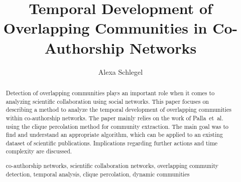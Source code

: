 \documentclass[runningheads,a4paper]{llncs}
\newcommand{\keywords}[1]{\par\addvspace\baselineskip
\noindent\keywordname\enspace\ignorespaces#1}
\begin{document}
\mainmatter  %

\title{Temporal Development of Overlapping Communities in Co-Authorship Networks}


%
%
\author{Alexa Schlegel%
}
%


%
%

\maketitle


\begin{abstract}
Detection of overlapping communities plays an important role when it comes to analyzing scientific collaboration using social networks. This paper focuses on describing a method to analyze the temporal development of overlapping communities within co-authorship networks. The paper mainly relies on the work of Palla~et~al. using the clique percolation method for community extraction. The main goal was to find and understand an appropriate algorithm, which can be applied to an existing dataset of scientific publications. Implications regarding further actions and time complexity are discussed.

\keywords{co-authorship networks, scientific collaboration networks, overlapping community detection, temporal analysis, clique percolation, dynamic communities}
\end{abstract}
\end{document}
